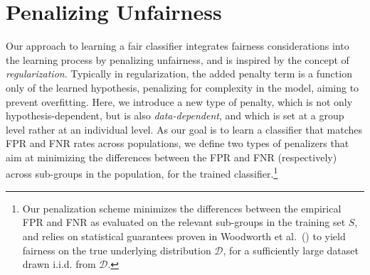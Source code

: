 \section{Penalizing Unfairness} \label{regularization}

Our approach to learning a fair classifier integrates fairness considerations into the learning process by penalizing unfairness, and is inspired by the concept of {\em regularization}. Typically in regularization, the added penalty term is a function only of the learned hypothesis, penalizing for complexity in the model, aiming to prevent overfitting. Here, we introduce a new type of penalty, which is not only hypothesis-dependent, but is also {\em data-dependent}, and which is set at a group level rather at an individual level. As our goal is to learn a classifier that matches FPR and FNR rates across populations, we define two types of penalizers that aim at minimizing the differences between the FPR and FNR (respectively) across sub-groups in the population, for the trained classifier.\footnote{Our penalization scheme minimizes the differences between the empirical FPR and FNR as evaluated on the relevant sub-groups in the training set $S$, and relies on statistical guarantees proven in Woodworth et al.~(\citeyear{woodworth}) to yield fairness on the true underlying distribution $\mathcal{D}$, for a sufficiently large dataset drawn i.i.d. from $\mathcal{D}$.}  




